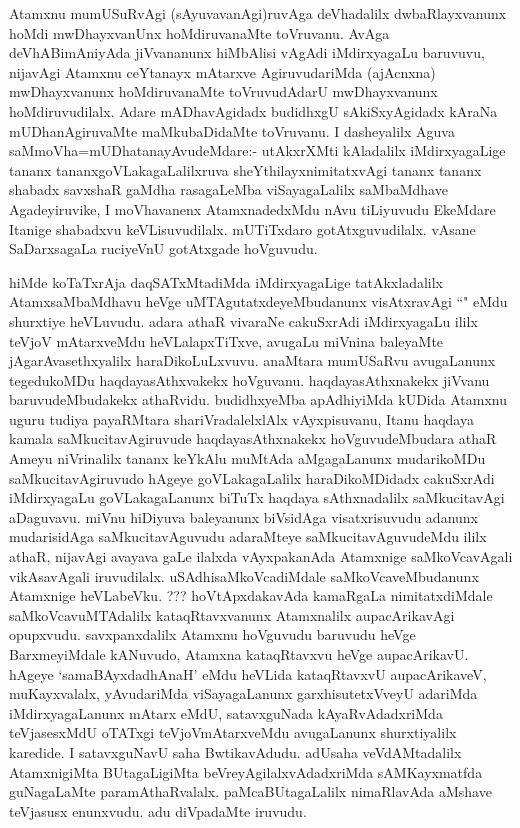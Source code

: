 
\begin{artha}
Atamxnu mumUSuRvAgi (sAyuvavanAgi)ruvAga deVhadalilx dwbaRlayxvanunx hoMdi mwDhayxvanUnx hoMdiruvanaMte toVruvanu. AvAga deVhABimAniyAda jiVvananunx hiMbAlisi vAgAdi iMdirxyagaLu baruvuvu, nijavAgi Atamxnu ceYtanayx mAtarxve AgiruvudariMda (ajAcnxna) mwDhayxvanunx hoMdiruvanaMte toVruvudAdarU mwDhayxvanunx hoMdiruvudilalx. Adare mADhavAgidadx budidhxgU sAkiSxyAgidadx kAraNa mUDhanAgiruvaMte maMkubaDidaMte toVruvanu. I dasheyalilx Aguva saMmoVha=mUDhatanayAvudeMdare:- utAkxrXMti kAladalilx iMdirxyagaLige tananx tananxgoVLakagaLalilxruva sheYthilayxnimitatxvAgi tananx tananx shabadx savxshaR gaMdha rasagaLeMba viSayagaLalilx saMbaMdhave Agadeyiruvike, I moVhavanenx AtamxnadedxMdu nAvu tiLiyuvudu EkeMdare Itanige shabadxvu keVLisuvudilalx. mUTiTxdaro gotAtxguvudilalx. vAsane SaDarxsagaLa ruciyeVnU gotAtxgade hoVguvudu.  
\end{artha}

\begin{artha}
hiMde koTaTxrAja daqSATxMtadiMda iMdirxyagaLige tatAkxladalilx AtamxsaMbaMdhavu heVge uMTAgutatxdeyeMbudanunx visAtxravAgi ``\stext " eMdu shurxtiye heVLuvudu. adara athaR vivaraNe cakuSxrAdi iMdirxyagaLu ililx teVjoV mAtarxveMdu heVLalapxTiTxve, avugaLu miVnina baleyaMte jAgarAvasethxyalilx haraDikoLuLxvuvu. anaMtara mumUSaRvu avugaLanunx tegedukoMDu haqdayasAthxvakekx hoVguvanu. haqdayasAthxnakekx jiVvanu baruvudeMbudakekx athaRvidu. budidhxyeMba apAdhiyiMda kUDida Atamxnu uguru tudiya payaRMtara shariVradalelxlAlx vAyxpisuvanu, Itanu haqdaya kamala saMkucitavAgiruvude haqdayasAthxnakekx hoVguvudeMbudara athaR Ameyu niVrinalilx tananx keYkAlu muMtAda aMgagaLanunx mudarikoMDu saMkucitavAgiruvudo hAgeye goVLakagaLalilx haraDikoMDidadx cakuSxrAdi iMdirxyagaLu goVLakagaLanunx biTuTx haqdaya sAthxnadalilx saMkucitavAgi aDaguvavu. miVnu hiDiyuva baleyanunx biVsidAga visatxrisuvudu adanunx mudarisidAga saMkucitavAguvudu adaraMteye saMkucitavAguvudeMdu ililx athaR, nijavAgi avayava gaLe ilalxda vAyxpakanAda Atamxnige saMkoVcavAgali vikAsavAgali iruvudilalx. uSAdhisaMkoVcadiMdale saMkoVcaveMbudanunx Atamxnige heVLabeVku. ??? hoVtApxdakavAda kamaRgaLa nimitatxdiMdale saMkoVcavuMTAdalilx kataqRtavxvanunx Atamxnalilx aupacArikavAgi opupxvudu. savxpanxdalilx Atamxnu hoVguvudu baruvudu heVge BarxmeyiMdale kANuvudo, Atamxna kataqRtavxvu heVge aupacArikavU. hAgeye `samaBAyxdadhAnaH' eMdu heVLida kataqRtavxvU aupacArikaveV, muKayxvalalx, yAvudariMda viSayagaLanunx garxhisutetxVveyU adariMda iMdirxyagaLanunx mAtarx eMdU, satavxguNada kAyaRvAdadxriMda teVjasesxMdU oTATxgi teVjoVmAtarxveMdu avugaLanunx shurxtiyalilx karedide. I satavxguNavU saha BwtikavAdudu. adUsaha veVdAMtadalilx AtamxnigiMta BUtagaLigiMta beVreyAgilalxvAdadxriMda sAMKayxmatfda guNagaLaMte paramAthaRvalalx. paMcaBUtagaLalilx nimaRlavAda aMshave teVjasusx enunxvudu. adu diVpadaMte iruvudu. 
\end{artha}

